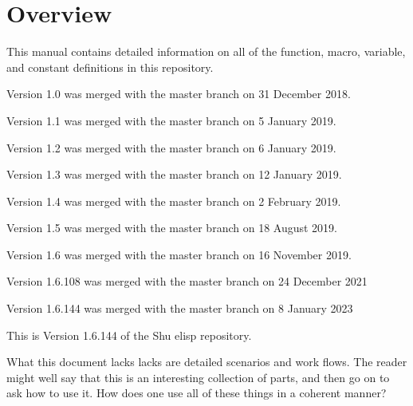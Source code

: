 




\section{Overview}


This manual contains detailed information on all of the function, macro,
variable, and constant definitions in this repository.

Version 1.0 was merged with the master branch on 31 December 2018.

Version 1.1 was merged with the master branch on 5 January 2019.

Version 1.2 was merged with the master branch on 6 January 2019.

Version 1.3 was merged with the master branch on 12 January 2019.

Version 1.4 was merged with the master branch on 2 February 2019.

Version 1.5 was merged with the master branch on 18 August 2019.

Version 1.6 was merged with the master branch on 16 November 2019.

Version 1.6.108 was merged with the master branch on 24 December 2021

Version 1.6.144 was merged with the master branch on 8 January 2023

This is Version 1.6.144 of the Shu elisp repository.

What this document lacks lacks are detailed scenarios and work flows.  The
reader might well say that this is an interesting collection of parts, and
then go on to ask how to use it.  How does one use all of these things in a
coherent manner?

